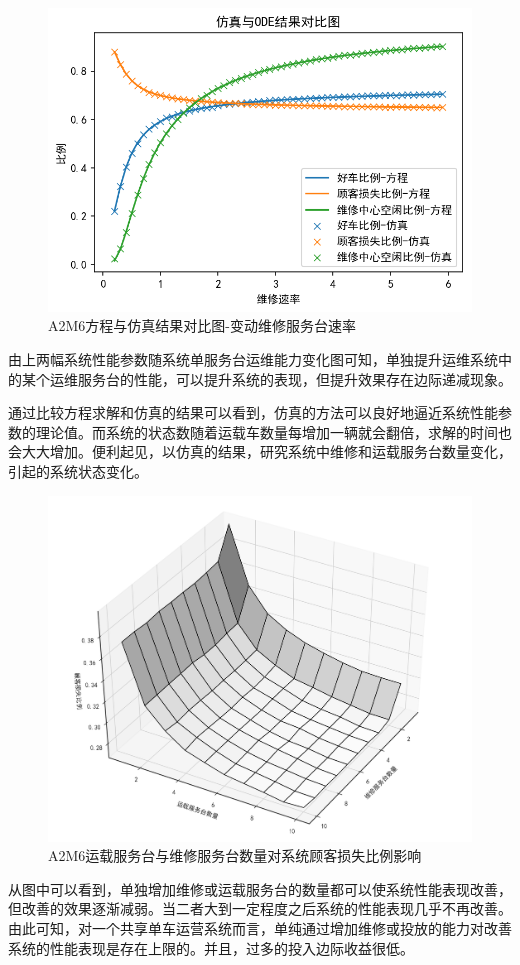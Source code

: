 \documentclass{article}
\begin{document}
\begin{figure}[H]
    \centering
    \includegraphics[scale=0.5]{A2M6仿真-odeSingleVaryMu.png}
    \caption{A2M6方程与仿真结果对比图-变动维修服务台速率}
    \label{fig:cenmodel}
\end{figure}
由上两幅系统性能参数随系统单服务台运维能力变化图可知，单独提升运维系统中的某个运维服务台的性能，可以提升系统的表现，但提升效果存在边际递减现象。

通过比较方程求解和仿真的结果可以看到，仿真的方法可以良好地逼近系统性能参数的理论值。而系统的状态数随着运载车数量每增加一辆就会翻倍，求解的时间也会大大增加。便利起见，以仿真的结果，研究系统中维修和运载服务台数量变化，引起的系统状态变化。
\begin{figure}[H]
    \centering
    \includegraphics[scale=0.5]{A2M6VN3D.png}
    \caption{A2M6运载服务台与维修服务台数量对系统顾客损失比例影响}
    \label{fig:cenmodel}
\end{figure}
从图中可以看到，单独增加维修或运载服务台的数量都可以使系统性能表现改善，但改善的效果逐渐减弱。当二者大到一定程度之后系统的性能表现几乎不再改善。由此可知，对一个共享单车运营系统而言，单纯通过增加维修或投放的能力对改善系统的性能表现是存在上限的。并且，过多的投入边际收益很低。
\end{document}
